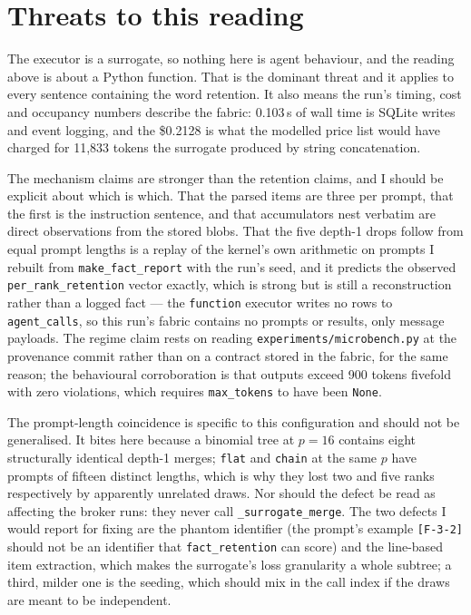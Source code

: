 \documentclass[11pt]{article}
\begin{document}
\section{Threats to this reading}

The executor is a surrogate, so nothing here is agent behaviour, and the reading above is
about a Python function. That is the dominant threat and it applies to every sentence
containing the word retention. It also means the run's timing, cost and occupancy numbers
describe the fabric: 0.103\,s of wall time is SQLite writes and event logging, and the
\$0.2128 is what the modelled price list would have charged for 11{,}833 tokens the
surrogate produced by string concatenation.

The mechanism claims are stronger than the retention claims, and I should be explicit about
which is which. That the parsed items are three per prompt, that the first is the
instruction sentence, and that accumulators nest verbatim are direct observations from the
stored blobs. That the five depth-1 drops follow from equal prompt lengths is a replay of
the kernel's own arithmetic on prompts I rebuilt from \texttt{make\_fact\_report} with the
run's seed, and it predicts the observed \texttt{per\_rank\_retention} vector exactly, which
is strong but is still a reconstruction rather than a logged fact --- the
\texttt{function} executor writes no rows to \texttt{agent\_calls}, so this run's fabric
contains no prompts or results, only message payloads. The regime claim rests on reading
\texttt{experiments/microbench.py} at the provenance commit rather than on a contract stored
in the fabric, for the same reason; the behavioural corroboration is that outputs exceed
900 tokens fivefold with zero violations, which requires \texttt{max\_tokens} to have been
\texttt{None}.

The prompt-length coincidence is specific to this configuration and should not be
generalised. It bites here because a binomial tree at $p=16$ contains eight structurally
identical depth-1 merges; \texttt{flat} and \texttt{chain} at the same $p$ have prompts of
fifteen distinct lengths, which is why they lost two and five ranks respectively by
apparently unrelated draws. Nor should the defect be read as affecting the broker runs: they
never call \texttt{\_surrogate\_merge}. The two defects I would report for fixing are the
phantom identifier (the prompt's example \texttt{[F-3-2]} should not be an identifier that
\texttt{fact\_retention} can score) and the line-based item extraction, which makes the
surrogate's loss granularity a whole subtree; a third, milder one is the seeding, which
should mix in the call index if the draws are meant to be independent.
\end{document}
